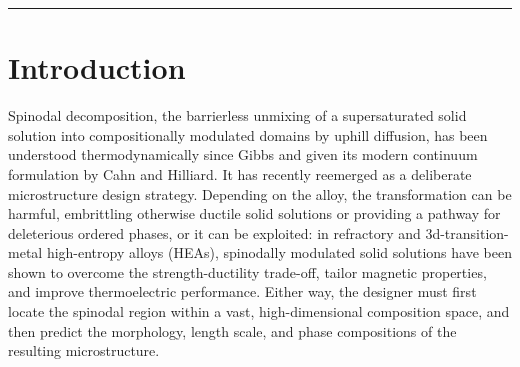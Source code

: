 \documentclass[12pt]{article}
\begin{document}
\vspace{4pt}
\noindent\rule{\linewidth}{1pt}
\vspace{10pt}


\section{Introduction}

Spinodal decomposition, the barrierless unmixing of a supersaturated solid solution into compositionally modulated domains by uphill diffusion, has been understood thermodynamically since Gibbs\cite{gibbs1878equilibrium} and given its modern continuum formulation by Cahn and Hilliard.\cite{cahn1958free,cahn1961spinodal} It has recently reemerged as a deliberate microstructure design strategy. Depending on the alloy, the transformation can be harmful, embrittling otherwise ductile solid solutions\cite{wang2023spinodal} or providing a pathway for deleterious ordered phases,\cite{dasari2023crystallographic} or it can be exploited: in refractory and 3d-transition-metal high-entropy alloys (HEAs), spinodally modulated solid solutions have been shown to overcome the strength-ductility trade-off,\cite{an2021spinodal,zhang2022refinement,lee2025spinodal} tailor magnetic properties,\cite{rao2021beyond,dong2024cooperative} and improve thermoelectric performance.\cite{duan2025spinodal} Either way, the designer must first locate the spinodal region within a vast, high-dimensional composition space, and then predict the morphology, length scale, and phase compositions of the resulting microstructure.
\end{document}
